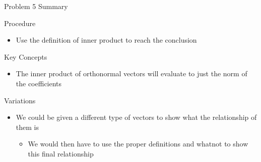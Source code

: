 \begin{summary}{Problem 5 Summary}
    \begin{statement}{Procedure}
        \begin{itemize}
            \item Use the definition of inner product to reach the conclusion
        \end{itemize}
    \end{statement}
    \begin{statement}{Key Concepts}
        \begin{itemize}
            \item The inner product of orthonormal vectors will evaluate to just the norm of the coefficients
        \end{itemize}
    \end{statement}
    \begin{statement}{Variations}
        \begin{itemize}
            \item We could be given a different type of vectors to show what the relationship of them is
            \begin{itemize}
                \item We would then have to use the proper definitions and whatnot to show this final relationship
            \end{itemize}
        \end{itemize}
    \end{statement}
\end{summary}


